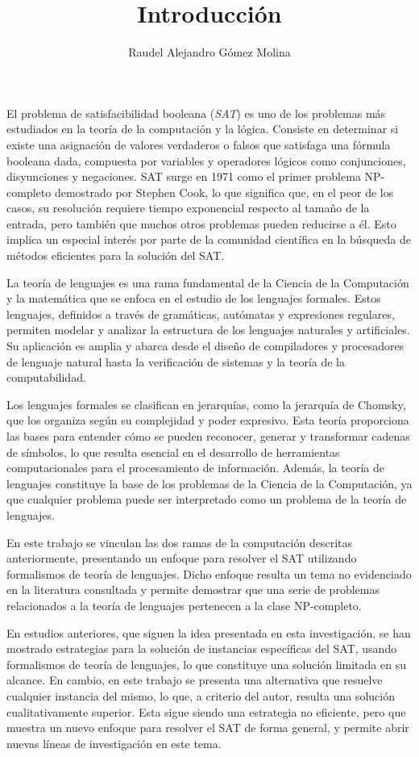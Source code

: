 \documentclass[12pt]{article}
\title{Introducción}
\author{Raudel Alejandro Gómez Molina}
\begin{document}
\maketitle

El problema de satisfacibilidad booleana (\textit{SAT}) es uno de los problemas más estudiados en la teoría de la computación y la lógica.
Consiste en determinar si existe una asignación de valores verdaderos o falsos que satisfaga una fórmula booleana dada, compuesta
por variables y operadores lógicos como conjunciones, disyunciones y negaciones. SAT surge en 1971 como el primer problema NP-completo demostrado por
Stephen Cook,
lo que significa que, en el peor de los casos, su resolución requiere tiempo exponencial respecto al
tamaño de la entrada, pero también que muchos otros problemas pueden reducirse a él. Esto
implica un especial interés por parte de la comunidad científica en la búsqueda de métodos eficientes para la solución
del SAT.

La teoría de lenguajes es una rama fundamental de la Ciencia de la Computación y la matemática que se
enfoca en el estudio de los lenguajes formales. Estos lenguajes, definidos a través de gramáticas,
autómatas y expresiones regulares, permiten modelar y analizar la estructura de los lenguajes naturales y
artificiales. Su aplicación es amplia y abarca desde el diseño de compiladores y procesadores de lenguaje
natural hasta la verificación de sistemas y la teoría de la computabilidad.

Los lenguajes formales se
clasifican en jerarquías, como la jerarquía de Chomsky, que los organiza según su complejidad y poder
expresivo. Esta teoría proporciona las bases para entender cómo se pueden reconocer, generar y transformar
cadenas de símbolos, lo que resulta esencial en el desarrollo de herramientas computacionales para
el procesamiento de información. Además, la teoría de lenguajes constituye la base de los problemas de la Ciencia
de la Computación, ya que cualquier problema puede ser interpretado como un problema de la teoría de lenguajes.

En este trabajo se vinculan las dos ramas de la computación descritas anteriormente, presentando un enfoque para resolver el SAT
utilizando formalismos de teoría de lenguajes. Dicho enfoque resulta un tema no evidenciado en la literatura consultada
y permite demostrar que una serie de problemas relacionados a la teoría de lenguajes pertenecen a la clase NP-completo.

En estudios anteriores, que siguen la idea presentada en esta investigación, se han mostrado estrategias para la solución
de instancias específicas del SAT, usando formalismos de teoría de lenguajes, lo que constituye una solución limitada en su alcance.
En cambio, en este trabajo se presenta una alternativa que resuelve cualquier instancia del mismo, lo que, a criterio del autor, resulta una solución
cualitativamente superior. Esta sigue siendo una estrategia no eficiente, pero que
muestra un nuevo enfoque para resolver el SAT de forma general, y permite abrir nuevas líneas de investigación en este tema.
\end{document}
